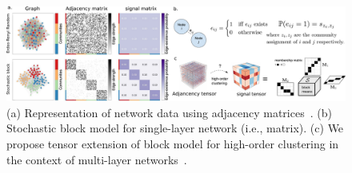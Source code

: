 \documentclass[10pt]{article}
\theoremstyle{plain}
\theoremstyle{definition}
\begin{document}
\begin{figure}[H]
\vspace{-.2cm}
\begin{center}
\includegraphics[width=.9\textwidth]{network1.pdf}
\caption{(a) Representation of network data using adjacency matrices~\cite{faskowitz2018weighted}. (b) Stochastic block model for single-layer network (i.e., matrix). (c) We propose tensor extension of block model for high-order clustering in the context of multi-layer networks~\cite{hu2019generalized,han2020exact}.}\label{fig:1}
\end{center}
\vspace{-.6cm}
\end{figure}
\end{document}
